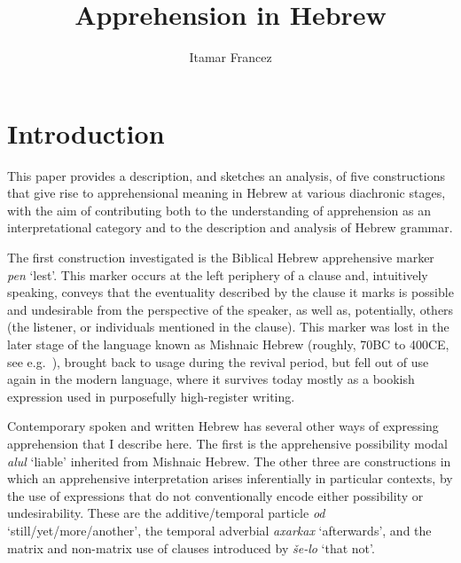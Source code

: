 \documentclass[output=paper,colorlinks,citecolor=brown]{langscibook}
\author{Itamar Francez\affiliation{University of Chicago}}
\title{Apprehension in Hebrew}
\begin{document}
\maketitle

\section{Introduction}
\label{francez:intro}
\largerpage
This paper provides a description, and sketches an analysis, of five constructions that give rise to apprehensional meaning in Hebrew at various diachronic stages, with the aim of contributing both to the understanding of apprehension as an interpretational category and to the description and analysis of Hebrew grammar. 

The first construction investigated is the Biblical Hebrew apprehensive marker \textit{pen} `lest'. This marker occurs at the left periphery of a clause and, intuitively speaking, conveys that the eventuality described by the clause it marks is possible and undesirable from the perspective of the speaker, as well as, potentially, others (the listener, or individuals mentioned in the clause). This marker was lost in the later stage of the language known as Mishnaic Hebrew (roughly, 70BC to 400CE, see e.g.\ \citealt{barasher99}), brought back to usage during the revival period, but fell out of use again in the modern language, where it survives today mostly as a bookish expression used in purposefully high-register writing. 

Contemporary spoken and written Hebrew has  several other ways of expressing apprehension that I describe here. The first is the apprehensive possibility modal \textit{alul} `liable' inherited from Mishnaic Hebrew. The other three are constructions in which an apprehensive interpretation arises inferentially in particular contexts, by the use of expressions that do not conventionally encode either possibility or undesirability. These are the additive/temporal particle \textit{od} `still/yet/more/another', the temporal adverbial \textit{axarkax} `afterwards', and the matrix and non-matrix use of clauses introduced by \textit{še-lo} `that not'.
\end{document}
